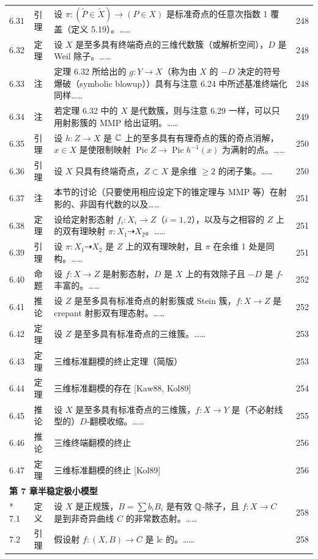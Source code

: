 \begin{longtable}{@{}p{}p{}p{}p{}@{}}
6.31 & 引理 & 设 $\pi:(\tilde P\in\tilde X)\to(P\in X)$ 是标准奇点的任意次指数 1 覆盖（定义 5.19）。…… & 248 \\
6.32 & 定理 & 设 $X$ 是至多具有终端奇点的三维代数簇（或解析空间），$D$ 是 Weil 除子。…… & 248 \\
6.33 & 注 & 定理 6.32 所给出的 $g:Y\to X$（称为由 $X$ 的 $-D$ 决定的符号爆破（symbolic blowup））具有与注意 6.24 中所述基准终端化同样…… & 248 \\
6.34 & 注 & 若定理 6.32 中的 $X$ 是代数簇，则与注意 6.29 一样，可以只用射影簇的 MMP 给出证明。…… & 249 \\
6.35 & 引理 & 设 $h:Z\to X$ 是 $\mathbb{C}$ 上的至多具有有理奇点的簇的奇点消解，$x\in X$ 是使限制映射 $\operatorname{Pic}Z\to\operatorname{Pic}h^{-1}(x)$ 为满射的点。…… & 250 \\
6.36 & 引理 & 设 $X$ 只具有终端奇点，$Z\subset X$ 是余维 $\ge2$ 的闭子集。…… & 250 \\
6.37 & 注 & 本节的讨论（只要使用相应设定下的锥定理与 MMP 等）在射影的、非固有代数的以及…… & 251 \\
6.38 & 定理 & 设给定射影态射 $f_i:X_i\to Z$（$i=1,2$），以及与之相容的 $Z$ 上的双有理映射 $\pi:X_1\dashrightarrow X_2$。…… & 251 \\
6.39 & 引理 & 设 $\pi:X_1\dashrightarrow X_2$ 是 $Z$ 上的双有理映射，且 $\pi$ 在余维 1 处是同构。…… & 251 \\
6.40 & 命题 & 设 $f:X\to Z$ 是射影态射，$D$ 是 $X$ 上的有效除子且 $-D$ 是 $f$-丰富的。…… & 252 \\
6.41 & 推论 & 设 $Z$ 是至多具有标准奇点的射影簇或 Stein 簇，$f:X\to Z$ 是 crepant 射影双有理态射。…… & 252 \\
6.42 & 定理 & 设 $Z$ 是至多具有标准奇点的三维簇。…… & 253 \\
6.43 & 定理 & 三维标准翻模的终止定理（简版） & 253 \\
6.44 & 定理 & 三维标准翻模的存在 {[Kaw88, Kol89]} & 254 \\
6.45 & 推论 & 设 $X$ 是至多具有标准奇点的三维簇，$f:X\to Y$ 是（不必射线型的）$D$-翻模收缩。…… & 255 \\
6.46 & 推论 & 三维终端翻模的终止 & 256 \\
6.47 & 定理 & 三维标准翻模的终止 {[Kol89]} & 256 \\
\multicolumn{4}{l}{\textbf{第 7 章\quad 半稳定极小模型}}\\*
7.1 & 定义 & 设 $X$ 是正规簇，$B=\sum b_iB_i$ 是有效 $\mathbb{Q}$-除子，且 $f\colon X\to C$ 是到非奇异曲线 $C$ 的非常数态射。…… & 258 \\
7.2 & 引理 & 假设射 $f\colon(X,B)\to C$ 是 lc 的。…… & 258 \\

\end{longtable}
